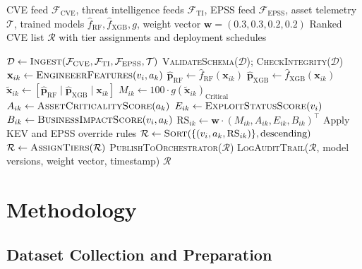 \documentclass[review,12pt]{elsarticle}
\begin{document}
\begin{algorithm}[htbp]
\caption{Context-Aware Vulnerability Prioritization}
\label{alg:main}
\begin{algorithmic}[1]
\Require CVE feed $\mathcal{F}_{\text{CVE}}$, threat intelligence feeds $\mathcal{F}_{\text{TI}}$, EPSS feed $\mathcal{F}_{\text{EPSS}}$, asset telemetry $\mathcal{T}$, trained models $\hat{f}_{\text{RF}}, \hat{f}_{\text{XGB}}, g$, weight vector $\mathbf{w} = (0.3, 0.3, 0.2, 0.2)$
\Ensure Ranked CVE list $\mathcal{R}$ with tier assignments and deployment schedules

\State $\mathcal{D} \gets \textsc{Ingest}(\mathcal{F}_{\text{CVE}}, \mathcal{F}_{\text{TI}}, \mathcal{F}_{\text{EPSS}}, \mathcal{T})$
\State \textsc{ValidateSchema}($\mathcal{D}$); \textsc{CheckIntegrity}($\mathcal{D}$)
  \State $\mathbf{x}_{ik} \gets \textsc{EngineeerFeatures}(v_i, a_k)$
  \State $\hat{\mathbf{p}}_{\text{RF}} \gets \hat{f}_{\text{RF}}(\mathbf{x}_{ik})$ 
  \State $\hat{\mathbf{p}}_{\text{XGB}} \gets \hat{f}_{\text{XGB}}(\mathbf{x}_{ik})$
  \State $\tilde{\mathbf{x}}_{ik} \gets [\hat{\mathbf{p}}_{\text{RF}} \mid \hat{\mathbf{p}}_{\text{XGB}} \mid \mathbf{x}_{ik}]$ 
  \State $M_{ik} \gets 100 \cdot g(\tilde{\mathbf{x}}_{ik})_{\text{Critical}}$
  \State $A_{ik} \gets \textsc{AssetCriticalityScore}(a_k)$
  \State $E_{ik} \gets \textsc{ExploitStatusScore}(v_i)$
  \State $B_{ik} \gets \textsc{BusinessImpactScore}(v_i, a_k)$
  \State $\text{RS}_{ik} \gets \mathbf{w} \cdot (M_{ik}, A_{ik}, E_{ik}, B_{ik})^\top$
  \State Apply KEV and EPSS override rules
\EndFor
\State $\mathcal{R} \gets \textsc{Sort}(\{(v_i, a_k, \text{RS}_{ik})\}, \text{descending})$
\State $\mathcal{R} \gets \textsc{AssignTiers}(\mathcal{R})$
\State \textsc{PublishToOrchestrator}($\mathcal{R}$)
\State \textsc{LogAuditTrail}($\mathcal{R}$, model versions, weight vector, timestamp)
\State \Return $\mathcal{R}$
\end{algorithmic}
\end{algorithm}

\section{Methodology}
\label{sec:methodology}

\subsection{Dataset Collection and Preparation}
\label{sec:methodology:data}
\end{document}
